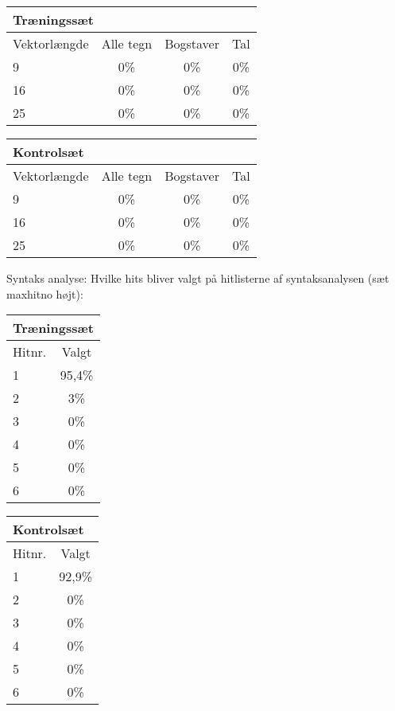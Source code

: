 \begin{tabular}{|l|c|c|c|}\hline
\multicolumn{4}{|l|}{Træningssæt} \\\hline
Vektorlængde & Alle tegn & Bogstaver & Tal \\\hline
9 & 0\% & 0\% & 0\% \\\hline
16 & 0\% & 0\% & 0\%\\\hline
25 & 0\% & 0\% & 0\%\\\hline \end{tabular}

\begin{tabular}{|l|c|c|c|}\hline
\multicolumn{4}{|l|}{Kontrolsæt} \\\hline
Vektorlængde & Alle tegn & Bogstaver & Tal \\\hline
9 & 0\% & 0\% & 0\% \\\hline
16 & 0\% & 0\% & 0\% \\\hline
25 & 0\% & 0\% & 0\% \\\hline \end{tabular}


Syntaks analyse: Hvilke hits bliver valgt på hitlisterne af syntaksanalysen (sæt maxhitno højt):

\begin{tabular}{|l|c|}\hline
\multicolumn{2}{|l|}{Træningssæt} \\\hline
Hitnr. & Valgt \\\hline
1 & 95,4\% \\\hline
2 & 3\% \\\hline
3 & 0\% \\\hline
4 & 0\% \\\hline
5 & 0\% \\\hline
6 & 0\% \\\hline \end{tabular}

\begin{tabular}{|l|c|}\hline
\multicolumn{2}{|l|}{Kontrolsæt} \\\hline
Hitnr. & Valgt \\\hline
1 & 92,9\% \\\hline
2 & 0\% \\\hline
3 & 0\% \\\hline
4 & 0\% \\\hline
5 & 0\% \\\hline
6 & 0\% \\\hline \end{tabular}

